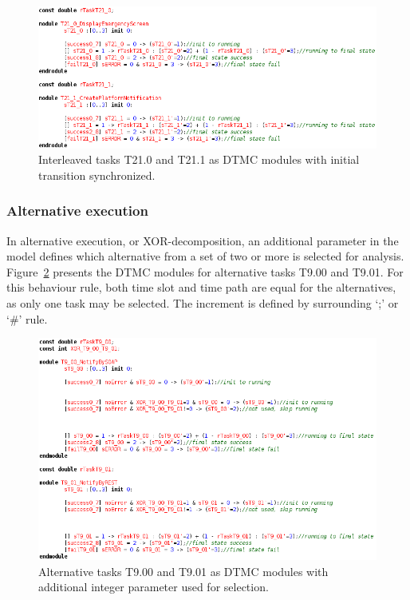 \begin{figure}[ht!]
\centering
\includegraphics[width=1\textwidth]{imgs/PRISM_PAR_TSKS.png}
\caption{Interleaved tasks T21.0 and T21.1 as DTMC modules with initial transition synchronized.}
\label{fig:PRISM_PAR_TSKS}
\end{figure}


\subsubsection{Alternative execution}

In alternative execution, or XOR-decomposition, an additional parameter in the model defines which alternative from a set of two or more is selected for analysis. Figure~\ref{fig:PRISM_ALT_TSKS} presents the DTMC modules for alternative tasks T9.00 and T9.01. For this behaviour rule, both time slot and time path are equal for the alternatives, as only one task may be selected. The increment is defined by surrounding `;' or `\#' rule. 

\begin{figure}[ht!]
\centering
\includegraphics[width=1\textwidth]{imgs/PRISM_ALT_TSKS.png}
\caption{Alternative tasks T9.00 and T9.01 as DTMC modules with additional integer parameter used for selection.}
\label{fig:PRISM_ALT_TSKS}
\end{figure}



